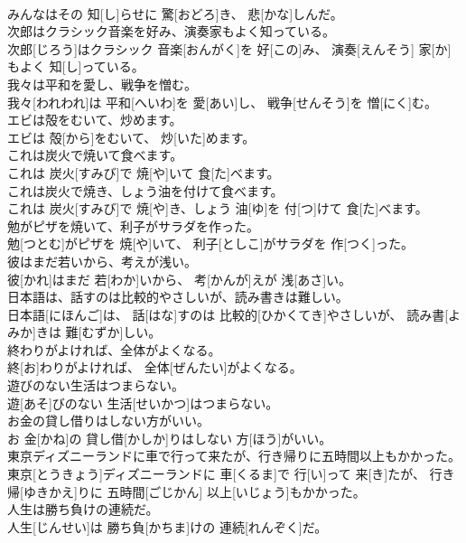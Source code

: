 \documentclass[8pt]{extreport}
\begin{document}
\begin{CJK}{UTF8}{min}
\\	みんなはその 知[し]らせに 驚[おどろ]き、 悲[かな]しんだ。
\\	次郎はクラシック音楽を好み、演奏家もよく知っている。	
\\	次郎[じろう]はクラシック 音楽[おんがく]を 好[この]み、 演奏[えんそう] 家[か]もよく 知[し]っている。
\\	我々は平和を愛し、戦争を憎む。	
\\	我々[われわれ]は 平和[へいわ]を 愛[あい]し、 戦争[せんそう]を 憎[にく]む。
\\	エビは殻をむいて、炒めます。	
\\	エビは 殻[から]をむいて、 炒[いた]めます。
\\	これは炭火で焼いて食べます。	
\\	これは 炭火[すみび]で 焼[や]いて 食[た]べます。
\\	これは炭火で焼き、しょう油を付けて食べます。	
\\	これは 炭火[すみび]で 焼[や]き、しょう 油[ゆ]を 付[つ]けて 食[た]べます。
\\	勉がピザを焼いて、利子がサラダを作った。	
\\	勉[つとむ]がピザを 焼[や]いて、 利子[としこ]がサラダを 作[つく]った。
\\	彼はまだ若いから、考えが浅い。	
\\	彼[かれ]はまだ 若[わか]いから、 考[かんが]えが 浅[あさ]い。
\\	日本語は、話すのは比較的やさしいが、読み書きは難しい。	
\\	日本語[にほんご]は、 話[はな]すのは 比較的[ひかくてき]やさしいが、 読み書[よみか]きは 難[むずか]しい。
\\	終わりがよければ、全体がよくなる。	
\\	終[お]わりがよければ、 全体[ぜんたい]がよくなる。
\\	遊びのない生活はつまらない。	
\\	遊[あそ]びのない 生活[せいかつ]はつまらない。
\\	お金の貸し借りはしない方がいい。	
\\	お 金[かね]の 貸し借[かしか]りはしない 方[ほう]がいい。
\\	東京ディズニーランドに車で行って来たが、行き帰りに五時間以上もかかった。	
\\	東京[とうきょう]ディズニーランドに 車[くるま]で 行[い]って 来[き]たが、 行き帰[ゆきかえ]りに 五時間[ごじかん] 以上[いじょう]もかかった。
\\	人生は勝ち負けの連続だ。	
\\	人生[じんせい]は 勝ち負[かちま]けの 連続[れんぞく]だ。

\end{CJK}
\end{document}
